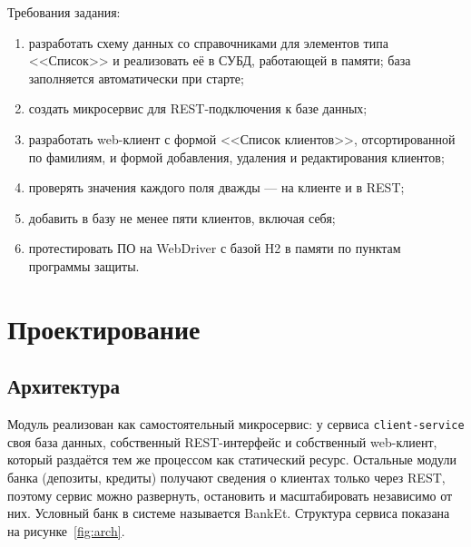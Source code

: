 \documentclass[14pt,a4paper]{extarticle}
\begin{document}
Требования задания:
\begin{enumerate}
\item разработать схему данных со справочниками для элементов типа <<Список>> и реализовать
её в СУБД, работающей в памяти; база заполняется автоматически при старте;
\item создать микросервис для REST-подключения к базе данных;
\item разработать web-клиент с формой <<Список клиентов>>, отсортированной по фамилиям,
и формой добавления, удаления и редактирования клиентов;
\item проверять значения каждого поля дважды --- на клиенте и в REST;
\item добавить в базу не менее пяти клиентов, включая себя;
\item протестировать ПО на WebDriver с базой H2 в памяти по пунктам программы защиты.
\end{enumerate}

\section{Проектирование}

\subsection{Архитектура}

Модуль реализован как самостоятельный микросервис: у сервиса \texttt{client-service} своя
база данных, собственный REST-интерфейс и собственный web-клиент, который раздаётся тем же
процессом как статический ресурс. Остальные модули банка (депозиты, кредиты) получают сведения
о клиентах только через REST, поэтому сервис можно развернуть, остановить и масштабировать
независимо от них. Условный банк в системе называется BankEt. Структура сервиса показана
на рисунке~\ref{fig:arch}.
\end{document}
